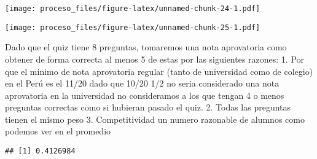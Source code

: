 \documentclass[
]{article}
\newenvironment{Shaded}{\begin{snugshade}}{\end{snugshade}}
\newcommand{\AttributeTok}[1]{\textcolor[rgb]{0.77,0.63,0.00}{#1}}
\newcommand{\ConstantTok}[1]{\textcolor[rgb]{0.00,0.00,0.00}{#1}}
\newcommand{\DecValTok}[1]{\textcolor[rgb]{0.00,0.00,0.81}{#1}}
\newcommand{\FloatTok}[1]{\textcolor[rgb]{0.00,0.00,0.81}{#1}}
\newcommand{\FunctionTok}[1]{\textcolor[rgb]{0.00,0.00,0.00}{#1}}
\newcommand{\NormalTok}[1]{#1}
\newcommand{\OtherTok}[1]{\textcolor[rgb]{0.56,0.35,0.01}{#1}}
\newcommand{\SpecialCharTok}[1]{\textcolor[rgb]{0.00,0.00,0.00}{#1}}
\newcommand{\StringTok}[1]{\textcolor[rgb]{0.31,0.60,0.02}{#1}}
\begin{document}
\texttt{[image: proceso\_files/figure-latex/unnamed-chunk-24-1.pdf]}

\begin{Shaded}
\end{Shaded}

\texttt{[image: proceso\_files/figure-latex/unnamed-chunk-25-1.pdf]}

Dado que el quiz tiene 8 preguntas, tomaremos una nota aprovatoria como
obtener de forma correcta al menos 5 de estas por las siguientes
razones: 1. Por que el minimo de nota aprovatoria regular (tanto de
universidad como de colegio) en el Perú es el 11/20 dado que 10/20 1/2
no seria considerado una nota aprovatoria en la universidad no
consideramos a los que tengan 4 o menos preguntas correctas como si
hubieran pasado el quiz. 2. Todas las preguntas tienen el mismo peso 3.
Competitividad un numero razonable de alumnos como podemos ver en el
promedio

\begin{Shaded}
\end{Shaded}

\begin{verbatim}
## [1] 0.4126984
\end{verbatim}
\end{document}
